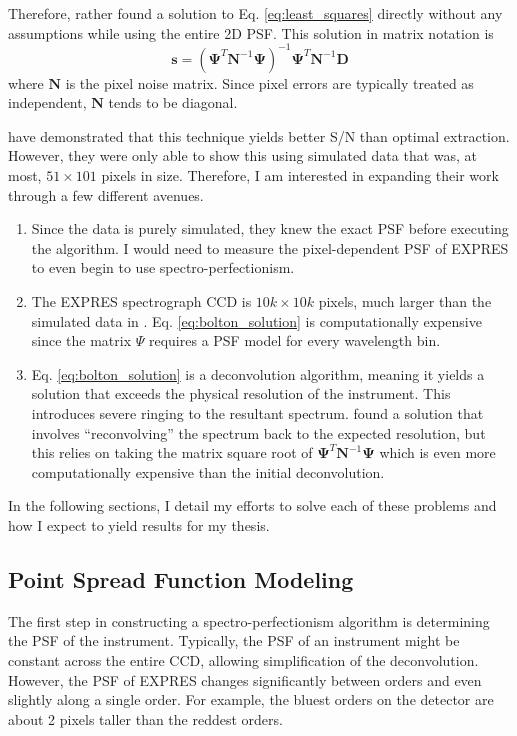 \documentclass[11pt]{article}
\begin{document}
Therefore, \citet{Bolton2009} rather found a solution to Eq. \ref{eq:least_squares} directly without any assumptions while using the entire 2D PSF. This solution in matrix notation is
\begin{equation}
    \textbf{s} = (\bm{\Psi}^T \bm{N}^{-1} \bm{\Psi})^{-1} \bm{\Psi}^T \bm{N}^{-1} \bm{D}
    \label{eq:bolton_solution}
\end{equation}
where $\bm{N}$ is the pixel noise matrix. Since pixel errors are typically treated as independent, $\bm{N}$ tends to be diagonal.

\citet{Bolton2009} have demonstrated that this technique yields better S/N than optimal extraction. However, they were only able to show this using simulated data that was, at most, $51\times101$ pixels in size. Therefore, I am interested in expanding their work through a few different avenues.
\begin{enumerate}
    \item Since the \citet{Bolton2009} data is purely simulated, they knew the exact PSF before executing the algorithm. I would need to measure the pixel-dependent PSF of EXPRES to even begin to use spectro-perfectionism.
    \item The EXPRES spectrograph CCD is $10k \times 10k$ pixels, much larger than the simulated data in \citet{Bolton2009}. Eq. \ref{eq:bolton_solution} is computationally expensive since the matrix $\Psi$ requires a PSF model for every wavelength bin.
    \item Eq. \ref{eq:bolton_solution} is a deconvolution algorithm, meaning it yields a solution that exceeds the physical resolution of the instrument. This introduces severe ringing to the resultant spectrum. \citet{Bolton2009} found a solution that involves ``reconvolving'' the spectrum back to the expected resolution, but this relies on taking the matrix square root of $\bm{\Psi}^T \bm{N}^{-1} \bm{\Psi}$ which is even more computationally expensive than the initial deconvolution.
\end{enumerate}
In the following sections, I detail my efforts to solve each of these problems and how I expect to yield results for my thesis.

\subsection{Point Spread Function Modeling}
\label{subsec:psf}

The first step in constructing a spectro-perfectionism algorithm is determining the PSF of the instrument. Typically, the PSF of an instrument might be constant across the entire CCD, allowing simplification of the deconvolution. However, the PSF of EXPRES changes significantly between orders and even slightly along a single order. For example, the bluest orders on the detector are about 2 pixels taller than the reddest orders.
\end{document}
